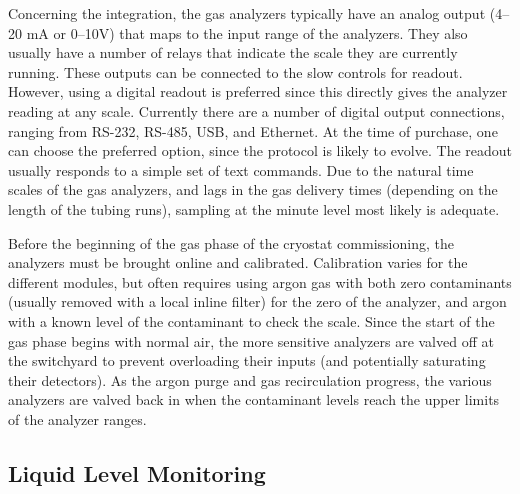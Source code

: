Concerning the integration, the gas analyzers typically have an analog output (\numrange{4}{20} \si{mA} or \numrange{0}{10}\si{V}) that maps to the input range of the analyzers. They also usually have a number of relays that indicate the scale they are currently running. These outputs can be connected to the slow controls for readout. However, using a digital readout is preferred since this directly gives the analyzer reading at any scale. Currently there are a number of digital output connections, ranging from RS-232, RS-485, USB, and Ethernet. At the time of purchase, one can choose the preferred option, since the protocol is likely to evolve. The readout usually responds to a simple set of text commands. Due to the natural time scales of the gas analyzers, and lags in the gas delivery times (depending on the length of the tubing runs), sampling at the minute level most likely is adequate. 

Before the beginning of the gas phase of the cryostat commissioning, the analyzers must be brought online and calibrated. Calibration varies for the different modules, but often requires using argon gas with both zero contaminants (usually removed with a local inline filter) for the zero of the analyzer, and argon with a known level of the contaminant to check the scale. Since the start of the gas phase  begins with normal air, the more sensitive analyzers are valved off at the switchyard to prevent overloading their inputs (and potentially saturating their detectors). As the argon purge and gas recirculation progress, the various analyzers are valved back in when the contaminant levels reach the upper limits of the analyzer ranges. 

\subsection{Liquid Level Monitoring}
\label{sec:fdgen-slow-cryo-install-llm}

